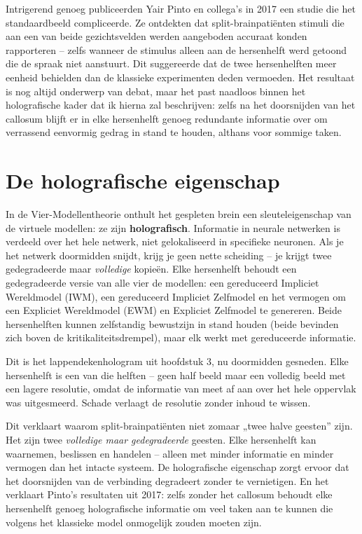 \documentclass[11pt, twoside, openright]{book}
\begin{document}
Intrigerend genoeg publiceerden Yair Pinto en collega's in 2017 een studie die het standaardbeeld compliceerde. Ze ontdekten dat split-brainpatiënten stimuli die aan een van beide gezichtsvelden werden aangeboden accuraat konden rapporteren -- zelfs wanneer de stimulus alleen aan de hersenhelft werd getoond die de spraak niet aanstuurt. Dit suggereerde dat de twee hersenhelften meer eenheid behielden dan de klassieke experimenten deden vermoeden. Het resultaat is nog altijd onderwerp van debat, maar het past naadloos binnen het holografische kader dat ik hierna zal beschrijven: zelfs na het doorsnijden van het callosum blijft er in elke hersenhelft genoeg redundante informatie over om verrassend eenvormig gedrag in stand te houden, althans voor sommige taken.

\section*{De holografische eigenschap}

In de Vier-Modellentheorie onthult het gespleten brein een sleuteleigenschap van de virtuele modellen: ze zijn \textbf{holografisch}. Informatie in neurale netwerken is verdeeld over het hele netwerk, niet gelokaliseerd in specifieke neuronen. Als je het netwerk doormidden snijdt, krijg je geen nette scheiding -- je krijgt twee gedegradeerde maar \textit{volledige} kopieën. Elke hersenhelft behoudt een gedegradeerde versie van alle vier de modellen: een gereduceerd Impliciet Wereldmodel (IWM), een gereduceerd Impliciet Zelfmodel en het vermogen om een Expliciet Wereldmodel (EWM) en Expliciet Zelfmodel te genereren. Beide hersenhelften kunnen zelfstandig bewustzijn in stand houden (beide bevinden zich boven de kritikaliteitsdrempel), maar elk werkt met gereduceerde informatie.

Dit is het lappendekenhologram uit hoofdstuk 3, nu doormidden gesneden. Elke hersenhelft is een van die helften -- geen half beeld maar een volledig beeld met een lagere resolutie, omdat de informatie van meet af aan over het hele oppervlak was uitgesmeerd. Schade verlaagt de resolutie zonder inhoud te wissen.

Dit verklaart waarom split-brainpatiënten niet zomaar „twee halve geesten” zijn. Het zijn twee \textit{volledige maar gedegradeerde} geesten. Elke hersenhelft kan waarnemen, beslissen en handelen -- alleen met minder informatie en minder vermogen dan het intacte systeem. De holografische eigenschap zorgt ervoor dat het doorsnijden van de verbinding degradeert zonder te vernietigen. En het verklaart Pinto's resultaten uit 2017: zelfs zonder het callosum behoudt elke hersenhelft genoeg holografische informatie om veel taken aan te kunnen die volgens het klassieke model onmogelijk zouden moeten zijn.
\end{document}
